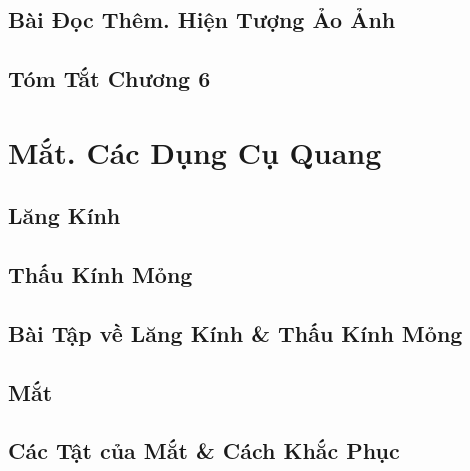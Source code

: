 \documentclass[oneside]{book}
\numberwithin{equation}{section}
\begin{document}

\section{Bài Đọc Thêm. Hiện Tượng Ảo Ảnh}


\section{Tóm Tắt Chương 6}


\chapter{Mắt. Các Dụng Cụ Quang}

\section{Lăng Kính}


\section{Thấu Kính Mỏng}


\section{Bài Tập về Lăng Kính \& Thấu Kính Mỏng}


\section{Mắt}


\section{Các Tật của Mắt \& Cách Khắc Phục}
\end{document}

